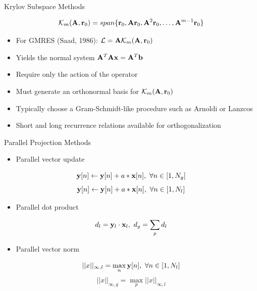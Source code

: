 \documentclass{beamer}
\begin{document}
\begin{frame}{Krylov Subspace Methods}

  \[
  \mathcal{K}_m(\mathbf{A},\mathbf{r}_0) = span\{\mathbf{r}_0, \mathbf{A}\mathbf{r}_0,
  \mathbf{A}^2\mathbf{r}_0, \dots, \mathbf{A}^{m-1}\mathbf{r}_0\}
  \]

  \begin{itemize}
  \item For GMRES (Saad, 1986): $\mathcal{L} = \mathbf{A}
    \mathcal{K}_m(\mathbf{A},\mathbf{r}_0)$
  \end{itemize}

  \medskip \medskip \medskip
  \small{
  \begin{itemize}
  \item Yields the normal system $\mathbf{A}^T\mathbf{A}\mathbf{x} =
    \mathbf{A}^T\mathbf{b}$
    \medskip
  \item Require only the action of the operator
    \medskip
  \item Must generate an orthonormal basis for
    $\mathcal{K}_m(\mathbf{A},\mathbf{r}_0)$
    \medskip
  \item Typically choose a Gram-Schmidt-like procedure such as Arnoldi
    or Lanzcos
    \medskip
  \item Short and long recurrence relations available for
    orthogonalization
  \end{itemize}
  }

\end{frame}

\begin{frame}{Parallel Projection Methods}
  
  \begin{itemize}
  \item Parallel vector update
  \end{itemize}
  \[
  \mathbf{y}[n] \leftarrow \mathbf{y}[n] + a * \mathbf{x}[n],\ \forall n \in
     [1,N_g]
  \]
  \[
  \mathbf{y}[n] \leftarrow \mathbf{y}[n] + a * \mathbf{x}[n],\ \forall n \in
     [1,N_l]
  \]
  
  \medskip \medskip
  \begin{itemize}
  \item Parallel dot product
  \end{itemize}
  \[
  d_l = \mathbf{y}_l \cdot \mathbf{x}_l,\ d_g = \sum_p d_l
  \]

  \medskip \medskip
  \begin{itemize}
  \item Parallel vector norm
  \end{itemize}
  \[
  ||x||_{\infty,l} = \max_n \ve{y}[n],\ \forall n \in [1,N_l]
  \]
  \[
  ||x||_{\infty,g} = \max_p ||x||_{\infty,l}
  \]
  
\end{frame}
\end{document}
